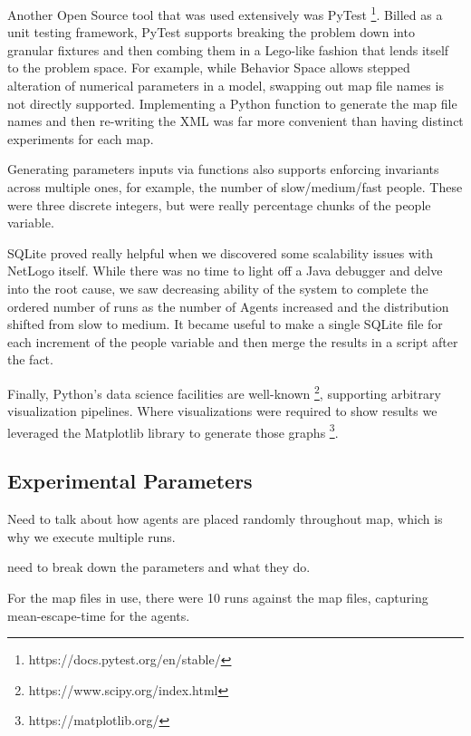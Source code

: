 \documentclass[12pt,letterpaper]{article}
\begin{document}
Another Open Source tool that was used extensively was PyTest \footnote{https://docs.pytest.org/en/stable/}. Billed as a
unit testing framework, PyTest supports breaking the problem down into granular
fixtures and then combing them in a Lego-like fashion that lends itself to the
problem space. For example, while Behavior Space allows stepped alteration of
numerical parameters in a model, swapping out map file names is not directly
supported. Implementing a Python function to generate the map file names and
then re-writing the XML was far more convenient than having distinct
experiments for each map.

Generating parameters inputs via functions also supports enforcing invariants
across multiple ones, for example, the number of slow/medium/fast people. These
were three discrete integers, but were really percentage chunks of the people
variable.

SQLite proved really helpful when we discovered some scalability issues with
NetLogo itself. While there was no time to light off a Java debugger and delve
into the root cause, we saw decreasing ability of the system to complete the
ordered number of runs as the number of Agents increased and the distribution
shifted from slow to medium. It became useful to make a single SQLite file for
each increment of the people variable and then merge the results in a script
after the fact.

Finally, Python's data science facilities are well-known \footnote{https://www.scipy.org/index.html}, supporting arbitrary visualization pipelines.  Where visualizations were required to show results we leveraged the Matplotlib library to generate those graphs \footnote{ https://matplotlib.org/}.

\subsection{Experimental Parameters}
Need to talk about how agents are placed randomly throughout map, which is why we execute multiple runs.

need to break down the parameters and what they do.  

For the map files in use, there were 10 runs against the map files, capturing
mean-escape-time for the agents.
\end{document}
